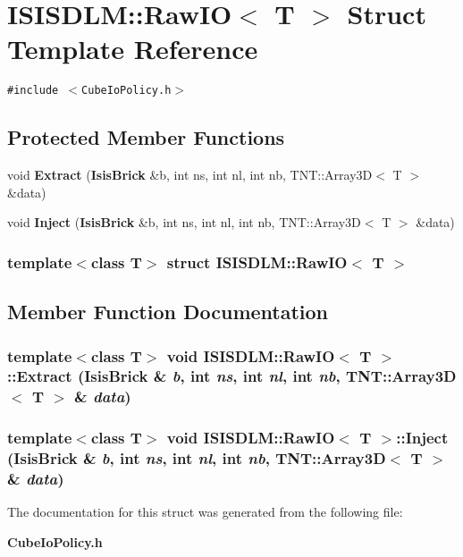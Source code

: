 \section{ISISDLM::Raw\-IO$<$ T $>$ Struct Template Reference}
\label{structISISDLM_1_1RawIO}
{\tt \#include $<$Cube\-Io\-Policy.h$>$}

\subsection*{Protected Member Functions}
\begin{CompactItemize}
\item 
void {\bf Extract} ({\bf Isis\-Brick} \&b, int ns, int nl, int nb, TNT::Array3D$<$ T $>$ \&data)
\item 
void {\bf Inject} ({\bf Isis\-Brick} \&b, int ns, int nl, int nb, TNT::Array3D$<$ T $>$ \&data)
\end{CompactItemize}
\subsubsection*{template$<$class T$>$ struct ISISDLM::Raw\-IO$<$ T $>$}



\subsection{Member Function Documentation}
\subsubsection{\setlength{\rightskip}{0pt plus 5cm}template$<$class T$>$ void {\bf ISISDLM::Raw\-IO}$<$ T $>$::Extract ({\bf Isis\-Brick} \& {\em b}, int {\em ns}, int {\em nl}, int {\em nb}, TNT::Array3D$<$ T $>$ \& {\em data})\hspace{0.3cm}{\tt  [inline, protected]}}\label{structISISDLM_1_1RawIO_b0}


\subsubsection{\setlength{\rightskip}{0pt plus 5cm}template$<$class T$>$ void {\bf ISISDLM::Raw\-IO}$<$ T $>$::Inject ({\bf Isis\-Brick} \& {\em b}, int {\em ns}, int {\em nl}, int {\em nb}, TNT::Array3D$<$ T $>$ \& {\em data})\hspace{0.3cm}{\tt  [inline, protected]}}\label{structISISDLM_1_1RawIO_b1}




The documentation for this struct was generated from the following file:\begin{CompactItemize}
\item 
{\bf Cube\-Io\-Policy.h}\end{CompactItemize}
